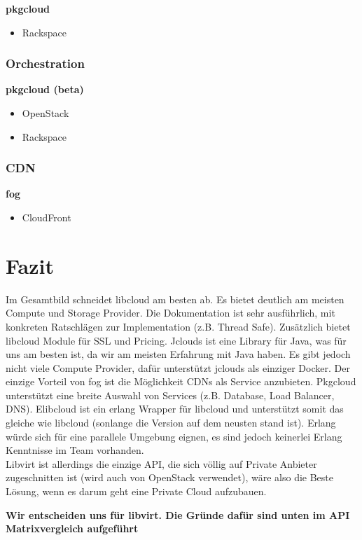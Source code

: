 \textbf{pkgcloud}
\begin{itemize}
\item Rackspace
\end{itemize}

\subsubsection{Orchestration}
\textbf{pkgcloud (beta)}
\begin{itemize}
\item OpenStack
\item Rackspace
\end{itemize}

\subsubsection{CDN}
\textbf{fog}
\begin{itemize}
\item CloudFront
\end{itemize}

\newpage

\section{Fazit}

Im Gesamtbild schneidet libcloud am besten ab. Es bietet deutlich am meisten Compute und 
Storage Provider. Die Dokumentation ist sehr ausführlich, mit konkreten Ratschlägen zur 
Implementation (z.B. Thread Safe). Zusätzlich bietet libcloud Module für SSL und Pricing.
Jclouds ist eine Library für Java, was für uns am besten ist, da wir am meisten Erfahrung mit 
Java haben. Es gibt jedoch nicht viele Compute Provider, dafür unterstützt jclouds als einziger Docker.
Der einzige Vorteil von fog ist die Möglichkeit CDNs als Service anzubieten.
Pkgcloud unterstützt eine breite Auswahl von Services (z.B. Database, Load Balancer, DNS).
Elibcloud ist ein erlang Wrapper für libcloud und unterstützt somit das gleiche wie libcloud 
(sonlange die Version auf dem neusten stand ist). Erlang würde sich für eine parallele Umgebung eignen, 
es sind jedoch keinerlei Erlang Kenntnisse im Team vorhanden.\\
Libvirt ist allerdings die einzige API, die sich völlig auf Private Anbieter 
zugeschnitten ist (wird auch von OpenStack verwendet), wäre also die Beste 
Lösung, wenn es darum geht eine Private Cloud aufzubauen.

\textbf{Wir entscheiden uns für libvirt. Die Gründe dafür sind unten im API Matrixvergleich aufgeführt}


